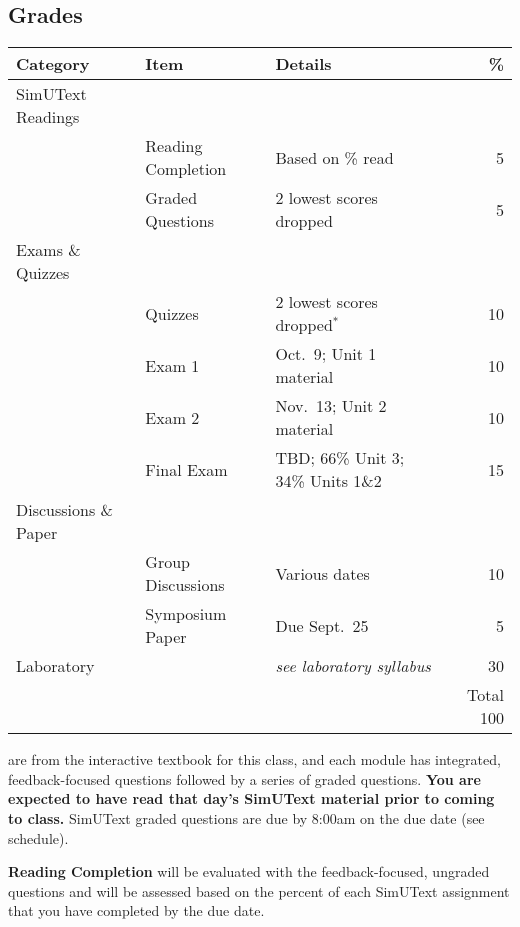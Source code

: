 \documentclass{tufte-handout}
\begin{document}
\begin{fullwidth}
\section{Grades}


\begin{table}
\begin{tabular}{l l l r}
Category & Item & Details & \% \\
\hline
SimUText Readings & \\
& Reading Completion & Based on \% read & 5 \\
& Graded Questions & 2 lowest scores dropped & 5 \\
\hline
Exams \& Quizzes \\
& Quizzes & 2 lowest scores dropped$^*$ & 10 \\
& Exam 1 & Oct.~9; Unit 1 material & 10 \\
& Exam 2 & Nov.~13; Unit 2 material & 10 \\
& Final Exam & TBD; 66\% Unit 3; 34\% Units 1\&2 & 15 \\ 							%
\hline 
Discussions \& Paper \\
& Group Discussions & Various dates & 10 \\
 & Symposium Paper & Due Sept.~25 & 5 \\
\hline
Laboratory & & \emph{see laboratory syllabus} & 30 \\
\hline
& & & Total 100
\end{tabular}
\end{table}

\end{fullwidth}

 are from the interactive textbook for this class, and each module has integrated, feedback-focused questions followed by a series of graded questions. \textbf{You are expected to have read that day's SimUText material prior to coming to class. } SimUText graded questions are due by 8:00am on the due date (see schedule).

\textbf{Reading Completion} will be evaluated with the feedback-focused, ungraded questions and will be assessed based on the percent of each SimUText assignment that you have completed by the due date. 
\end{document}
